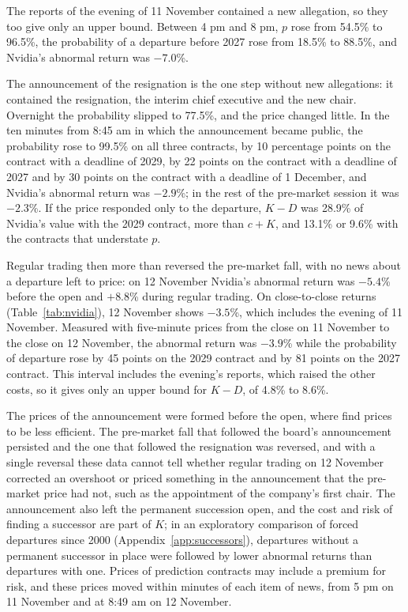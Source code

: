 \documentclass[11pt,a4paper]{article}
\begin{document}
The reports of the evening of 11 November contained a new allegation, so they too give only an upper bound. Between 4 pm and 8 pm, $p$ rose from 54.5\% to 96.5\%, the probability of a departure before 2027 rose from 18.5\% to 88.5\%, and Nvidia's abnormal return was $-7.0$\%.

The announcement of the resignation is the one step without new allegations: it contained the resignation, the interim chief executive and the new chair. Overnight the probability slipped to 77.5\%, and the price changed little. In the ten minutes from 8:45 am in which the announcement became public, the probability rose to 99.5\% on all three contracts, by 10 percentage points on the contract with a deadline of 2029, by 22 points on the contract with a deadline of 2027 and by 30 points on the contract with a deadline of 1 December, and Nvidia's abnormal return was $-2.9$\%; in the rest of the pre-market session it was $-2.3$\%. If the price responded only to the departure, $K - D$ was 28.9\% of Nvidia's value with the 2029 contract, more than $c + K$, and 13.1\% or 9.6\% with the contracts that understate $p$.

Regular trading then more than reversed the pre-market fall, with no news about a departure left to price: on 12 November Nvidia's abnormal return was $-5.4$\% before the open and $+8.8$\% during regular trading. On close-to-close returns (Table~\ref{tab:nvidia}), 12 November shows $-3.5$\%, which includes the evening of 11 November. Measured with five-minute prices from the close on 11 November to the close on 12 November, the abnormal return was $-3.9$\% while the probability of departure rose by 45 points on the 2029 contract and by 81 points on the 2027 contract. This interval includes the evening's reports, which raised the other costs, so it gives only an upper bound for $K - D$, of 4.8\% to 8.6\%.

The prices of the announcement were formed before the open, where \citet{barclay2003} find prices to be less efficient. The pre-market fall that followed the board's announcement persisted and the one that followed the resignation was reversed, and with a single reversal these data cannot tell whether regular trading on 12 November corrected an overshoot or priced something in the announcement that the pre-market price had not, such as the appointment of the company's first chair. The announcement also left the permanent succession open, and the cost and risk of finding a successor are part of $K$; in an exploratory comparison of forced departures since 2000 (Appendix~\ref{app:successors}), departures without a permanent successor in place were followed by lower abnormal returns than departures with one. Prices of prediction contracts may include a premium for risk, and these prices moved within minutes of each item of news, from 5 pm on 11 November and at 8:49 am on 12 November.
\end{document}
